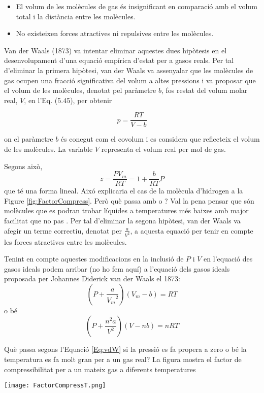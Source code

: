\begin{itemize}
    \item El volum de les molècules de gas és insignificant en comparació amb el volum total i la distància entre les molècules.
    \item No existeixen forces atractives ni repulsives entre les molècules.
\end{itemize}

Van der Waals (1873) va intentar eliminar aquestes dues hipòtesis en el desenvolupament d'una equació empírica d'estat per a gasos reals. Per tal d'eliminar la primera hipòtesi, van der Waals va assenyalar que les molècules de gas ocupen una fracció significativa del volum a altes pressions i va proposar que el volum de les molècules, denotat pel paràmetre $b$, fos restat del volum molar real, $V$, en l'Eq. (5.45), per obtenir

\[
p = \frac{RT}{V - b}
\]

on el paràmetre $b$ és conegut com el covolum i es considera que reflecteix el volum de les molècules. La variable $V$ representa el volum real per mol de gas.

Segons això,
\[z=\frac{PV_m}{RT}=1+\frac{b}{RT}P\]
que té una forma lineal. Aixó explicaria el cas de la molècula d'hidrogen a la Figure \ref{fig:FactorCompress}.
Però què passa amb  o ? Val la pena pensar que són molècules que es podran trobar líquides a temperatures més baixes amb major facilitat que no pas . 
Per tal d'eliminar la segona hipòtesi, van der Waals va afegir un terme correctiu, denotat per $\frac{a}{V^2}$, a aquesta equació per tenir en compte les forces atractives entre les molècules.

Tenint en compte aquestes modificacions en la inclusió de $P$ i $V$ en l'equació des gasos ideals podem arribar (no ho fem aquí) a l'equació dels gasos ideals proposada per Johannes Diderick van der Waals el 1873:
\[
\left( P + \frac{a}{{V_m}^2} \right) (V_m -b)=RT
\]
o bé
\begin{equation}
\left( P + \frac{n^2 a}{V^2} \right) (V -nb)=nRT
\label{Eq:vdW}
\end{equation}

\begin{exr}
Què passa segons l'Equació \ref{Eq:vdW} si la pressió es fa propera a zero o bé la temperatura es fa molt gran per a un gas real?   La figura mostra el factor de compressibilitat per a un mateix gas a diferents temperatures
\begin{center}        \texttt{[image: FactorCompressT.png]}
\end{center}
\end{exr}


